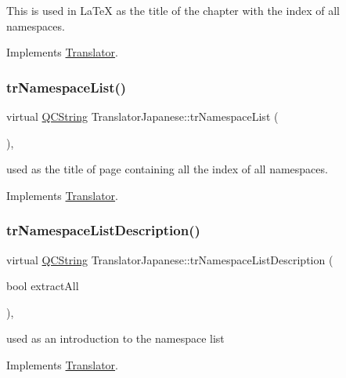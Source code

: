 This is used in La\+TeX as the title of the chapter with the index of all namespaces. 

Implements \mbox{\hyperlink{class_translator}{Translator}}.

\mbox{\label{class_translator_japanese_aeb30ffc6599808c003bdd5c270e81cb4}} 
\subsubsection{\texorpdfstring{trNamespaceList()}{trNamespaceList()}}
{\footnotesize\ttfamily virtual \mbox{\hyperlink{class_q_c_string}{Q\+C\+String}} Translator\+Japanese\+::tr\+Namespace\+List (\begin{DoxyParamCaption}{ }\end{DoxyParamCaption})\hspace{0.3cm}{\ttfamily [inline]}, {\ttfamily [virtual]}}

used as the title of page containing all the index of all namespaces. 

Implements \mbox{\hyperlink{class_translator}{Translator}}.

\mbox{\label{class_translator_japanese_af5b31a9e3585f90971d5813c927f67ef}} 
\subsubsection{\texorpdfstring{trNamespaceListDescription()}{trNamespaceListDescription()}}
{\footnotesize\ttfamily virtual \mbox{\hyperlink{class_q_c_string}{Q\+C\+String}} Translator\+Japanese\+::tr\+Namespace\+List\+Description (\begin{DoxyParamCaption}\item[{bool}]{extract\+All }\end{DoxyParamCaption})\hspace{0.3cm}{\ttfamily [inline]}, {\ttfamily [virtual]}}

used as an introduction to the namespace list 

Implements \mbox{\hyperlink{class_translator}{Translator}}.

